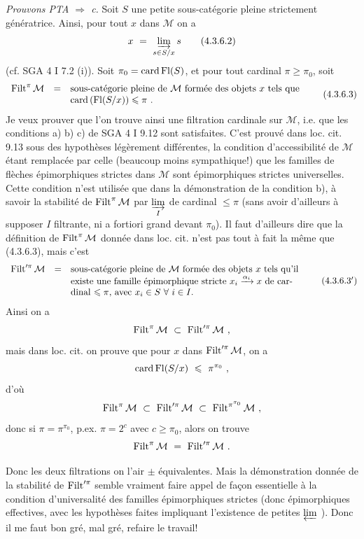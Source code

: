 \noindent\textit{Prouvons PTA $\Longrightarrow$ c.} Soit $S$ une petite sous-catégorie pleine strictement génératrice. Ainsi, pour tout $x$ dans $\mathcal M$ on a
\[
x\ =\ \varinjlim_{s\in S/x}s
\tag*{(4.3.6.2)}
\]
(cf. SGA 4 I 7.2 (i)). Soit $\pi_0=\operatorname{card}\operatorname{Fl}(S)$, et pour tout cardinal $\pi\geqslant\pi_0$, soit
\[
\begin{array}{lcl}
\operatorname{Filt}^\pi\mathcal M & = & \text{sous-catégorie pleine de $\mathcal M$ formée des objets $x$ tels que}\\
 & & \operatorname{card}\,(\operatorname{Fl}(S/x))\leqslant\pi\ .
\end{array}
\tag*{(4.3.6.3)}
\]
Je veux prouver que l'on trouve ainsi une filtration cardinale sur $\mathcal M$, i.e. que les conditions a) b) c) de SGA 4 I 9.12 sont satisfaites. C'est prouvé dans loc. cit. 9.13 sous des hypothèses légèrement différentes, la condition d'accessibilité de $\mathcal M$ étant remplacée par celle (beaucoup moins sympathique!) que les familles de flèches épimorphiques strictes dans $\mathcal M$ sont épimorphiques strictes universelles. Cette condition n'est utilisée que dans la démonstration de la condition b), à savoir la stabilité de $\operatorname{Filt}^\pi\mathcal M$ par $\varinjlim\limits_I$ de cardinal $\leqslant\pi$ (sans avoir d'ailleurs à supposer $I$ filtrante, ni a fortiori grand devant $\pi_0$). Il faut d'ailleurs dire que la définition de $\operatorname{Filt}^\pi\mathcal M$ donnée dans loc. cit. n'est pas tout à fait la même que (4.3.6.3), mais c'est
\[
\begin{array}{lcl}
\operatorname{Filt}'^{\pi}\mathcal M & = & \text{sous-catégorie pleine de $\mathcal M$ formée des objets $x$ tels qu'il}\\
 & & \text{existe une famille épimorphique stricte $x_i\xrightarrow{\alpha_i}x$ de car-}\\
 & & \text{dinal $\leqslant\pi$, avec $x_i\in S\ \forall\ i\in I$.}
\end{array}
\tag*{(4.3.6.3$'$)}
\]
Ainsi on a
\[
\Filt^\pi\mathcal M\ \subset\ \Filt'^{\pi}\mathcal M\ ,
\]
mais dans loc. cit. on prouve que pour $x$ dans $\operatorname{Filt}'^{\pi}\mathcal M$, on a
\[
\card\Fl(S/x)\ \leqslant\ \pi^{\pi_0}\ ,
\]
d'où
\[
\Filt^\pi\mathcal M\ \subset\ \Filt'^{\pi}\mathcal M\ \subset\ \Filt^{\pi^{\pi_0}}\mathcal M\ ,
\]
donc si $\pi=\pi^{\pi_0}$, p.ex. $\pi=2^c$ avec $c\geqslant\pi_0$, alors on trouve
\[
\Filt^\pi\mathcal M\ =\ \Filt'^{\pi}\mathcal M\ .
\]

\noindent Donc les deux filtrations on l'air $\pm$ équivalentes. Mais la démonstration donnée de la stabilité de $\operatorname{Filt}'^{\pi}$ semble vraiment faire appel de façon essentielle à la condition d'universalité des familles épimorphiques strictes (donc épimorphiques effectives, avec les hypothèses faites impliquant l'existence de petites $\varprojlim$ ). Donc il me faut bon gré, mal gré, refaire le travail! %

